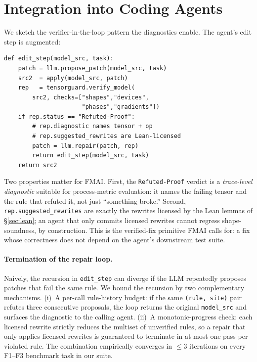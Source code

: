 \documentclass{article}
\begin{document}
\section{Integration into Coding Agents}
\label{sec:agentloop}

We sketch the verifier-in-the-loop pattern the diagnostics enable.
The agent's edit step is augmented:

\begin{lstlisting}
def edit_step(model_src, task):
    patch = llm.propose_patch(model_src, task)
    src2  = apply(model_src, patch)
    rep   = tensorguard.verify_model(
        src2, checks=["shapes","devices",
                      "phases","gradients"])
    if rep.status == "Refuted-Proof":
        # rep.diagnostic names tensor + op
        # rep.suggested_rewrites are Lean-licensed
        patch = llm.repair(patch, rep)
        return edit_step(model_src, task)
    return src2
\end{lstlisting}

Two properties matter for FMAI. First, the \texttt{Refuted-Proof}
verdict is a \emph{trace-level diagnostic} suitable for
process-metric evaluation: it names the failing tensor and the rule that
refuted it, not just ``something broke.'' Second,
\texttt{rep.suggested\_rewrites} are exactly the rewrites licensed by
the Lean lemmas of \S\ref{sec:lean}; an agent that only commits
licensed rewrites cannot regress shape-soundness, by construction.
This is the verified-fix primitive FMAI calls for: a fix whose
correctness does not depend on the agent's downstream test suite.

\paragraph{Termination of the repair loop.}
Naively, the recursion in \texttt{edit\_step} can diverge if the
LLM repeatedly proposes patches that fail the same rule. We
bound the recursion by two complementary mechanisms. (i)~A
per-call rule-history budget: if the same
\texttt{(rule, site)} pair refutes three consecutive proposals,
the loop returns the original \texttt{model\_src} and surfaces
the diagnostic to the calling agent. (ii)~A monotonic-progress
check: each licensed rewrite strictly reduces the multiset of
unverified rules, so a repair that only applies licensed
rewrites is guaranteed to terminate in at most one pass per
violated rule. The combination empirically converges in $\le 3$
iterations on every F1--F3 benchmark task in our suite.
\end{document}
